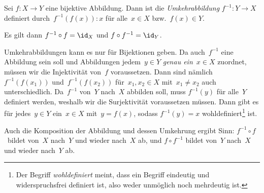 \documentclass[a4paper]{article}
\begin{document}
\begin{definition}[Umkehrabbildung]
    Sei $f\colon X \to Y$ eine bijektive Abbildung. Dann ist die \emph{Umkehrabbildung} $f^{-1}\colon Y \to X$ definiert durch~$f^{-1}(f(x)) \colon x$ für alle~$x \in X$ bzw.~$f(x) \in Y$.

    Es gilt dann $f^{-1} \circ f = \id_X$ und $f \circ f^{-1} = \id_Y$.
\end{definition}

Umkehrabbildungen kann es nur für Bijektionen geben. Da auch~$f^{-1}$ eine Abbildung sein soll und Abbildungen jedem~$y \in Y$ \emph{genau ein}~$x \in X$ zuordnet, müssen wir die Injektivität von~$f$ voraussetzen. Dann sind nämlich $f^{-1}(f(x_1))$ und~$f^{-1}(f(x_2))$ für~$x_1, x_2 \in X$ mit~$x_1 \neq x_2$ auch unterschiedlich. Da~$f^{-1}$ von~$Y$ nach~$X$ abbilden soll, muss $f^{-1}(y)$ für alle~$Y$ definiert werden, weshalb wir die Surjektivität voraussetzen müssen. Dann gibt es für jedes~$y \in Y$ ein~$x \in X$ mit~$y = f(x)$, sodass $f^{-1}(y) = x$ wohldefiniert\footnote{Der Begriff \emph{wohldefiniert} meint, dass ein Begriff eindeutig und widerspruchsfrei definiert ist, also weder unmöglich noch mehrdeutig ist.} ist.

Auch die Komposition der Abbildung und dessen Umkehrung ergibt Sinn: $f^{-1} \circ f$~bildet von~$X$ nach~$Y$ und wieder nach~$X$ ab, und $f \circ f^{-1}$ bildet von~$Y$ nach~$X$ und wieder nach~$Y$ ab.
\end{document}
